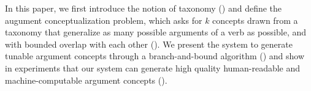 
In this paper, we first introduce the notion of taxonomy ()
and define the augument conceptualization problem,
which asks for $k$ concepts drawn from a taxonomy
that generalize as many possible arguments
of a verb as possible, and with bounded overlap with each other
(). We present the system
to generate tunable argument concepts through a branch-and-bound
algorithm () and show in experiments that our system can
generate high quality human-readable and machine-computable
argument concepts ().


%

